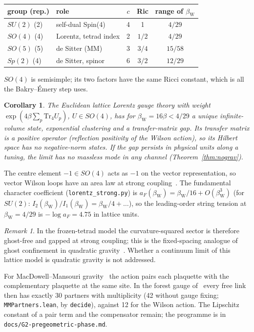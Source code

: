 \documentclass[aps,prd,twocolumn,superscriptaddress,nofootinbib]{revtex4-2}
\newtheorem{corollary}[theorem]{Corollary}
\theoremstyle{remark}
\newtheorem*{remark}{Remark}
\newcommand{\bW}{\beta_{\mathrm W}}
\begin{document}
\begin{center}
\begin{tabular}{llccc}
\hline
group (rep.) & role & $c$ & Ric & range of $\bW$\\
\hline
$SU(2)$ (2) & self-dual Spin(4) & 4 & 1 & $4/29$\\
$SO(4)$ (4) & Lorentz, tetrad index & 2 & $1/2$ & $4/29$\\
$SO(5)$ (5) & de Sitter (MM) & 3 & $3/4$ & $15/58$\\
$Sp(2)$ (4) & de Sitter, spinor & 6 & $3/2$ & $12/29$\\
\hline
\end{tabular}
\end{center}

$SO(4)$ is semisimple; its two factors have the same Ricci constant, which is all the Bakry--\'Emery step uses.

\begin{corollary}\label{cor:lorentz}
The Euclidean lattice Lorentz gauge theory with weight $\exp(4\beta\sum_p\mathrm{Tr}_4U_p)$, $U\in SO(4)$, has for
$\bW=16\beta<4/29$ a unique infinite-volume state, exponential clustering and a transfer-matrix gap. Its transfer
matrix is a positive operator (reflection positivity of the Wilson action), so its Hilbert space has no
negative-norm states. If the gap persists in physical units along a tuning, the limit has no massless mode in any
channel (Theorem~\ref{thm:nograv}).
\end{corollary}

The centre element $-1\in SO(4)$ acts as $-1$ on the vector representation, so vector Wilson loops have an area law
at strong coupling~\cite{OS}. The fundamental character coefficient (\texttt{lorentz\_strong.py}) is
$a_F(\bW)=\bW/16+O(\bW^3)$ (for $SU(2)$: $I_2(\bW)/I_1(\bW)=\bW/4+\dots$), so the leading-order string tension
at $\bW=4/29$ is $-\log a_F=4.75$ in lattice units.

\begin{remark}
In the frozen-tetrad model the curvature-squared sector is therefore ghost-free and gapped at strong coupling; this
is the fixed-spacing analogue of ghost confinement in quadratic gravity~\cite{HR,LQA}. Whether a continuum limit of
this lattice model is quadratic gravity is not addressed.
\end{remark}

For MacDowell--Mansouri gravity~\cite{MM} the action pairs each plaquette with the complementary plaquette at the
same site. In the forest gauge of~\cite{4YM} every free link then has exactly 30 partners with multiplicity (42
without gauge fixing; \texttt{MMPartners.lean}, by \texttt{decide}), against 12 for the Wilson action. The
Lipschitz constant of a pair term and the compensator remain; the programme is in
\texttt{docs/G2-pregeometric-phase.md}.
\end{document}
